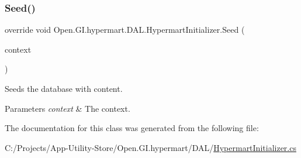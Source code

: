 \subsubsection{\texorpdfstring{Seed()}{Seed()}}
{\footnotesize\ttfamily override void Open.\+G\+I.\+hypermart.\+D\+A\+L.\+Hypermart\+Initializer.\+Seed (\begin{DoxyParamCaption}\item[{\hyperlink{class_open_1_1_g_i_1_1hypermart_1_1_d_a_l_1_1_hypermart_context}{Hypermart\+Context}}]{context }\end{DoxyParamCaption})\hspace{0.3cm}{\ttfamily [protected]}}



Seeds the database with content. 


\begin{DoxyParams}{Parameters}
{\em context} & The context.\\
\hline
\end{DoxyParams}


The documentation for this class was generated from the following file\+:\begin{DoxyCompactItemize}
\item 
C\+:/\+Projects/\+App-\/\+Utility-\/\+Store/\+Open.\+G\+I.\+hypermart/\+D\+A\+L/\hyperlink{_hypermart_initializer_8cs}{Hypermart\+Initializer.\+cs}\end{DoxyCompactItemize}
